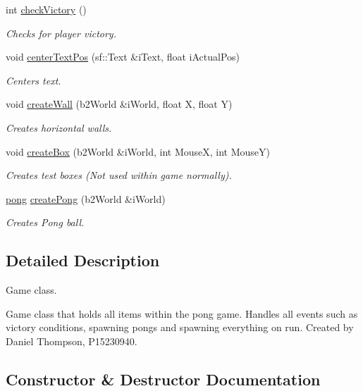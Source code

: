\begin{DoxyCompactItemize}
int \hyperlink{classgame_a5297f3ca1e18dfc8c4efd718b54b4982}{check\+Victory} ()
\begin{DoxyCompactList}\small\item\em Checks for player victory. \end{DoxyCompactList}\item 
void \hyperlink{classgame_a0b6f017a6d6d053ae89bc2ac3cbaa1aa}{center\+Text\+Pos} (sf\+::\+Text \&i\+Text, float i\+Actual\+Pos)
\begin{DoxyCompactList}\small\item\em Centers text. \end{DoxyCompactList}\item 
void \hyperlink{classgame_ae6f0753388b6ac52a3efd7073fc55934}{create\+Wall} (b2\+World \&i\+World, float X, float Y)
\begin{DoxyCompactList}\small\item\em Creates horizontal walls. \end{DoxyCompactList}\item 
void \hyperlink{classgame_a8d6319c1da22e9d41292feb3091bf562}{create\+Box} (b2\+World \&i\+World, int MouseX, int MouseY)
\begin{DoxyCompactList}\small\item\em Creates test boxes (Not used within game normally). \end{DoxyCompactList}\item 
\hyperlink{classpong}{pong} \hyperlink{classgame_a0f2725bdacb5162d7570a04cf8648490}{create\+Pong} (b2\+World \&i\+World)
\begin{DoxyCompactList}\small\item\em Creates Pong ball. \end{DoxyCompactList}\end{DoxyCompactItemize}


\subsection{Detailed Description}
Game class. 

Game class that holds all items within the pong game. Handles all events such as victory conditions, spawning pongs and spawning everything on run. Created by Daniel Thompson, P15230940. 

\subsection{Constructor \& Destructor Documentation}
\mbox{\label{classgame_a57f5809d56037158e9bafa65c8173609}} 

